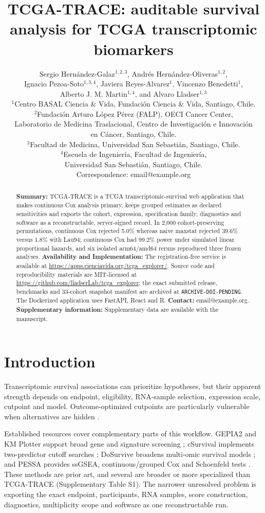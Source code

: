 \documentclass[12pt]{article}
\title{TCGA-TRACE: auditable survival analysis for TCGA transcriptomic biomarkers}
\author{
  Sergio Hernández-Galaz$^{1,2,3}$,
  Andrés Hernández-Oliveras$^{1,2}$,\\
  Ignacio Pezoa-Soto$^{1,3,4}$,
  Javiera Reyes-Alvarez$^{1}$,
  Vincenzo Benedetti$^{1}$,\\
  Alberto J. M. Martin$^{1,4}$, and
  Alvaro Lladser$^{1,3}$\\
  $^{1}$Centro BASAL Ciencia \& Vida, Fundación Ciencia \& Vida,
  Santiago, Chile.\\
  $^{2}$Fundación Arturo López Pérez (FALP), OECI Cancer Center,\\
  Laboratorio de Medicina Traslacional, Centro de Investigación e Innovación\\
  en Cáncer, Santiago, Chile.\\
  $^{3}$Facultad de Medicina, Universidad San Sebastián,
  Santiago, Chile.\\
  $^{4}$Escuela de Ingeniería, Facultad de Ingeniería,\\
  Universidad San Sebastián, Santiago, Chile.\\
  Correspondence: email@example.org
}
\date{}
\begin{document}
\maketitle

\begin{abstract}
\noindent
\textbf{Summary:}
TCGA-TRACE is a TCGA transcriptomic-survival web application that makes
continuous Cox analysis primary, keeps grouped estimates as declared
sensitivities and exports the cohort, expression, specification family,
diagnostics and software as a reconstructable, server-signed record.
In 2,000 cohort-preserving permutations, continuous Cox rejected 5.0\% whereas
naive maxstat rejected 39.6\% versus 1.8\% with Lau94; continuous Cox had
99.2\% power under simulated linear proportional hazards, and six isolated
arm64/amd64 reruns reproduced three frozen analyses.
\textbf{Availability and Implementation:}
The registration-free service is available at
\url{https://apps.cienciavida.org/tcga_explorer/}. Source code and
reproducibility materials are MIT-licensed at
\url{https://github.com/lladserLab/tcga_explorer}; the exact submitted release,
benchmarks and 33-cohort snapshot manifest are archived at
\texttt{ARCHIVE-DOI-PENDING}. The Dockerized application uses FastAPI, React
and R.
\textbf{Contact:} email@example.org.
\textbf{Supplementary information:} Supplementary data are available with the
manuscript.
\end{abstract}

\section{Introduction}

Transcriptomic survival associations can prioritize hypotheses, but their
apparent strength depends on endpoint, eligibility, RNA-sample selection,
expression scale, cutpoint and model. Outcome-optimized cutpoints are
particularly vulnerable when alternatives are hidden
\citep{altmanRoyston2006}.

Established resources cover complementary parts of this workflow. GEPIA2 and
KM Plotter support broad gene and signature screening
\citep{gepia22019,kmplotter2021}; cSurvival implements two-predictor cutoff
searches \citep{csurvival2022}; DoSurvive broadens multi-omic survival models
\citep{dousurvive2023}; and PESSA provides ssGSEA, continuous/grouped Cox and
Schoenfeld tests \citep{pessa2024}. These methods are prior art, and several are
broader or more specialized than TCGA-TRACE (Supplementary Table S1). The
narrower unresolved problem is exporting the exact endpoint, participants, RNA
samples, score construction, diagnostics, multiplicity scope and software as
one reconstructable run.
\end{document}
